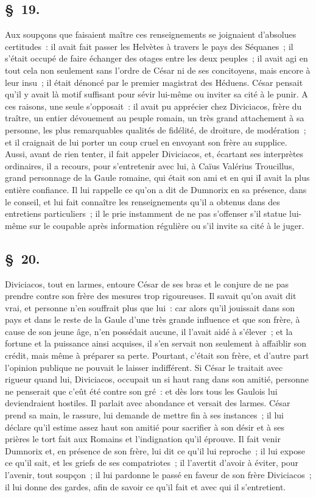 \documentclass[french,twoside]{book} %
\begin{document}
\subsection[{§ 19.}]{ \textsc{§ 19.} }
\noindent Aux soupçons que faisaient maître ces renseignements se joignaient d’absolues certitudes : il avait fait passer les Helvètes à travers le pays des Séquanes ; il s’était occupé de faire échanger des otages entre les deux peuples ; il avait agi en tout cela non seulement sans l’ordre de César ni de ses concitoyens, mais encore à leur insu ; il était dénoncé par le premier magistrat des Héduens. César pensait qu’il y avait là motif suffisant pour sévir lui-même ou inviter sa cité à le punir. A ces raisons, une seule s’opposait : il avait pu apprécier chez Diviciacos, frère du traître, un entier dévouement au peuple romain, un très grand attachement à sa personne, les plus remarquables qualités de fidélité, de droiture, de modération ; et il craignait de lui porter un coup cruel en envoyant son frère au supplice. Aussi, avant de rien tenter, il fait appeler Diviciacos, et, écartant ses interprètes ordinaires, il a recours, pour s’entretenir avec lui, à Caïus Valérius Troucillus, grand personnage de la Gaule romaine, qui était son ami et en qui iI avait la plus entière confiance. Il lui rappelle ce qu’on a dit de Dumnorix en sa présence, dans le conseil, et lui fait connaître les renseignements qu’il a obtenus dans des entretiens particuliers ; il le prie instamment de ne pas s’offenser s’il statue lui-même sur le coupable après information régulière ou s’il invite sa cité à le juger.
\subsection[{§ 20.}]{ \textsc{§ 20.} }
\noindent Diviciacos, tout en larmes, entoure César de ses bras et le conjure de ne pas prendre contre son frère des mesures trop rigoureuses. Il savait qu’on avait dit vrai, et personne n’en souffrait plus que lui : car alors qu’il jouissait dans son pays et dans le reste de la Gaule d’une très grande influence et que son frère, à cause de son jeune âge, n’en possédait aucune, il l’avait aidé à s’élever ; et la fortune et la puissance ainsi acquises, il s’en servait non seulement à affaiblir son crédit, mais même à préparer sa perte. Pourtant, c’était son frère, et d’autre part l’opinion publique ne pouvait le laisser indifférent. Si César le traitait avec rigueur quand lui, Diviciacos, occupait un si haut rang dans son amitié, personne ne penserait que c’eût été contre son gré : et dès lors tous les Gaulois lui deviendraient hostiles. Il parlait avec abondance et versait des larmes. César prend sa main, le rassure, lui demande de mettre fin à ses instances ; il lui déclare qu’il estime assez haut son amitié pour sacrifier à son désir et à ses prières le tort fait aux Romains et l’indignation qu’il éprouve. Il fait venir Dumnorix et, en présence de son frère, lui dit ce qu’il lui reproche ; il lui expose ce qu’il sait, et les griefs de ses compatriotes ; il l’avertit d’avoir à éviter, pour l’avenir, tout soupçon ; il lui pardonne le passé en faveur de son frère Diviciacos ; il lui donne des gardes, afin de savoir ce qu’il fait et avec qui il s’entretient.
\end{document}
